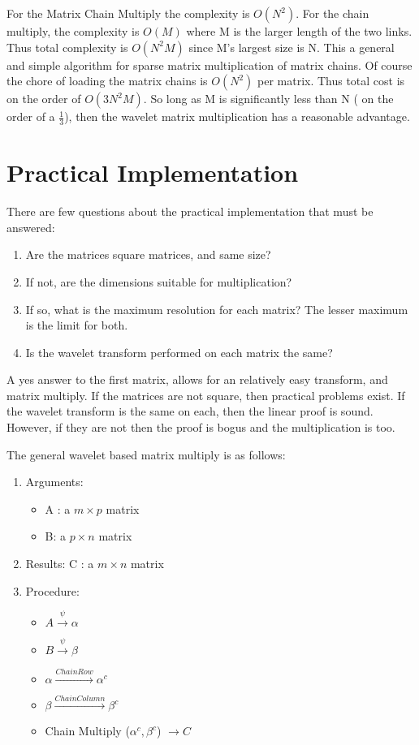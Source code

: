 \documentclass[11pt]{article}
\begin{document}
For the Matrix Chain Multiply the complexity is $O(N^2)$.  For the chain multiply, the complexity is $O(M)$ where M is the larger length of the two links.  Thus total complexity is $O(N^2 M)$ since M's largest size is N.  This a general and simple algorithm for sparse matrix multiplication of matrix chains.  Of course the chore of loading the matrix chains is $O(N^2)$ per matrix.  Thus total cost is on the order of $O(3N^2 M)$.  So long as M is significantly less than N ( on the order of a $\frac{1}{3}$), then the wavelet matrix multiplication has a reasonable advantage.  

\section{Practical Implementation}

There are few questions about the practical implementation that must be answered:
\begin{enumerate}
\item Are the matrices square matrices, and same size?
\item If not, are the dimensions suitable for multiplication?
\item If so, what is the maximum resolution for each matrix?  The lesser maximum is the limit for both.
\item Is the wavelet transform performed on each matrix the same?
\end{enumerate}

A yes answer to the first matrix, allows for an relatively easy transform, and matrix multiply.  If the matrices are not square, then practical problems exist.  If the wavelet transform is the same on each, then the linear proof is sound.  However, if they are not then the proof is bogus and the multiplication is too.  

The general wavelet based matrix multiply is as follows:
\begin{enumerate}
\item Arguments:  
\begin{itemize}
\item A :  a $m \times p$ matrix
\item B: a $p \times n$ matrix
\end{itemize}
\item Results:  C : a $m \times n$ matrix
\item Procedure:
\begin{itemize}
\item $ A \stackrel{\psi}{\to} \alpha$
\item $ B \stackrel{\psi}{\to} \beta$
\item $ \alpha \stackrel {Chain Row}{\to} \alpha ^c$
\item $ \beta \stackrel {Chain Column}{\to} \beta ^c$
\item Chain Multiply ($\alpha ^c , \beta ^c$) $\to C$ 
\end{itemize}
\end{enumerate}
\end{document}
